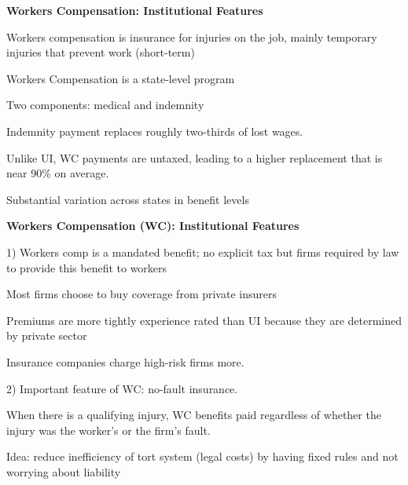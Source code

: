 \documentclass[landscape]{slides}
\begin{document}
%
%
%
%
%
%






\begin{slide}
\begin{center}
{\bf Workers Compensation: Institutional Features}
\end{center}

Workers compensation is insurance
for injuries on the job, mainly temporary injuries that prevent work (short-term)

Workers Compensation is a state-level program

Two components: medical and indemnity

Indemnity payment replaces roughly two-thirds of lost wages.

Unlike UI, WC payments are untaxed, leading to a higher replacement that is near 90\% on average.

Substantial variation across states in benefit levels


\end{slide}

%



\begin{slide}
\begin{center}
{\bf Workers Compensation (WC): Institutional Features}
\end{center}
1) Workers comp is a mandated benefit; no explicit tax but firms required by law to provide this benefit to workers

Most firms choose to buy coverage from private insurers

Premiums are more tightly experience rated than UI because they are determined by private sector

Insurance companies charge high-risk firms more.

2) Important feature of WC: no-fault insurance.

When there is a qualifying injury, WC benefits paid regardless of whether the injury was the worker's or the firm's fault.

Idea: reduce inefficiency of tort system (legal costs) by having fixed rules and not worrying about liability


\end{slide}
\end{document}
